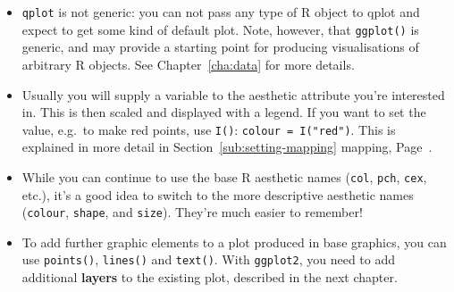 \begin{itemize}
  \item {\tt qplot} is not generic: you can not pass any type of R object to qplot and expect to get some kind of default plot.  Note, however, that {\tt ggplot()} is generic, and may provide a starting point for producing visualisations of arbitrary R objects.  See Chapter~\ref{cha:data} for more details.
  
  \item Usually you will supply a variable to the aesthetic attribute you're interested in.  This is then scaled and displayed with a legend.  If you want to set the value, e.g.\ to make red points, use {\tt I()}: {\tt colour = I("red")}.  This is explained in more detail in Section~\ref{sub:setting-mapping} mapping, Page~\pageref{sub:setting-mapping}.
  
  \item While you can continue to use the base R aesthetic names ({\tt col},  {\tt pch}, {\tt cex}, etc.), it's a good idea to switch to the more descriptive \ggplot aesthetic names ({\tt colour}, {\tt shape}, and {\tt size}).  They're much easier to remember!

  \item To add further graphic elements to a plot produced in base graphics, you can use {\tt points()}, {\tt lines()} and {\tt text()}.  With {\tt ggplot2}, you need to add additional {\bf layers} to the existing plot, described in the next chapter.
  
\end{itemize}


